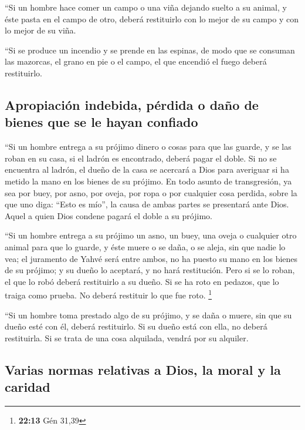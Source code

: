 \begin{paracol}{2}
 ``Si un hombre hace comer un campo o una viña dejando
suelto a su animal, y éste pasta en el campo de otro, deberá restituirlo
con lo mejor de su campo y con lo mejor de su viña.

 ``Si se produce un incendio y se prende en las espinas,
de modo que se consuman las mazorcas, el grano en pie o el campo, el que
encendió el fuego deberá restituirlo.

\hypertarget{apropiaciuxf3n-indebida-puxe9rdida-o-dauxf1o-de-bienes-que-se-le-hayan-confiado}{%
\subsection{Apropiación indebida, pérdida o daño de bienes que se le
hayan
confiado}\label{apropiaciuxf3n-indebida-puxe9rdida-o-dauxf1o-de-bienes-que-se-le-hayan-confiado}}

 ``Si un hombre entrega a su prójimo dinero o cosas para
que las guarde, y se las roban en su casa, si el ladrón es encontrado,
deberá pagar el doble.  Si no se encuentra al ladrón, el
dueño de la casa se acercará a Dios para averiguar si ha metido la mano
en los bienes de su prójimo.  En todo asunto de
transgresión, ya sea por buey, por asno, por oveja, por ropa o por
cualquier cosa perdida, sobre la que uno diga: ``Esto es mío'', la causa
de ambas partes se presentará ante Dios. Aquel a quien Dios condene
pagará el doble a su prójimo.

 ``Si un hombre entrega a su prójimo un asno, un buey,
una oveja o cualquier otro animal para que lo guarde, y éste muere o se
daña, o se aleja, sin que nadie lo vea;  el juramento de
Yahvé será entre ambos, no ha puesto su mano en los bienes de su
prójimo; y su dueño lo aceptará, y no hará restitución. 
Pero si se lo roban, el que lo robó deberá restituirlo a su dueño.
 Si se ha roto en pedazos, que lo traiga como prueba. No
deberá restituir lo que fue roto. \footnote{\textbf{22:13} Gén 31,39}

 ``Si un hombre toma prestado algo de su prójimo, y se
daña o muere, sin que su dueño esté con él, deberá restituirlo.
 Si su dueño está con ella, no deberá restituirla. Si se
trata de una cosa alquilada, vendrá por su alquiler.

\hypertarget{varias-normas-relativas-a-dios-la-moral-y-la-caridad}{%
\subsection{Varias normas relativas a Dios, la moral y la
caridad}\label{varias-normas-relativas-a-dios-la-moral-y-la-caridad}}


\end{paracol}
